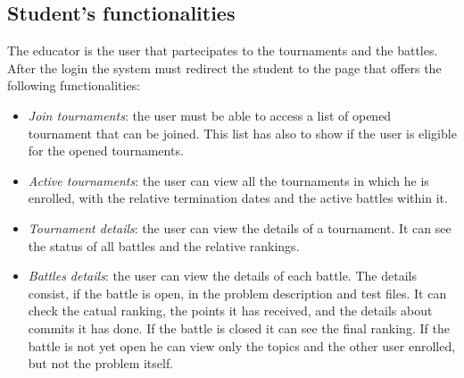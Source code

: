 \documentclass[12pt, a4paper]{report}
\begin{document}
    \subsection{Student's functionalities}
    The educator is the user that partecipates to the tournaments and the battles. 
    After the login the system must redirect the student to the page that offers the following functionalities: 
    \begin{itemize}
        \item \textit{Join tournaments}: the user must be able to access a list of opened tournament that can be joined. 
            This list has also to show if the user is eligible for the opened tournaments. 
        \item \textit{Active tournaments}: the user can view all the tournaments in which he is enrolled, with the relative termination dates and the active battles within it. 
        \item \textit{Tournament details}: the user can view the details of a tournament. 
            It can see the status of all battles and the relative rankings. 
        \item \textit{Battles details}: the user can view the details of each battle. 
            The details consist, if the battle is open, in the problem description and test files. 
            It can check the catual ranking, the points it has received, and the details about commits it has done. 
            If the battle is closed it can see the final ranking.
            If the battle is not yet open he can view only the topics and the other user enrolled, but not the problem itself. 
    \end{itemize}
\end{document}
